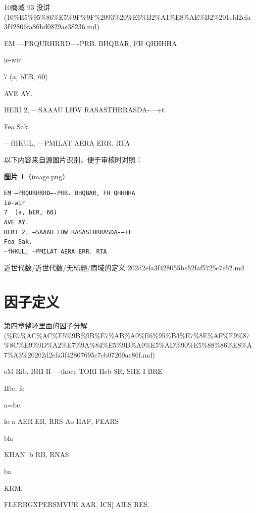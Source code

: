 \begin{note}[来源上级主题]

10商域 93 没讲 (10\%E5\%95\%86\%E5\%9F\%9F\%2093\%20\%E6\%B2\%A1\%E8\%AE\%B2\%201efd2efa3f42806fa86bd0829ae38236.md)

\end{note}

\begin{definition}[商域的定义]

EM —PRQURHRRD—-PRB. BHQBAR, FH QHHHHA

ie-wir

7  (a, bER, 60)

AVE AY.

HERI 2, —SAAAU LHW RASASTHRRASDA-—+t

Fea Sak.

—fHKUL, —PMILAT AERA ERR. RTA

\end{definition}

\begin{note}
以下内容来自源图片识别，便于审核时对照：

\textbf{图片 1}（image.png）
\begin{Verbatim}[fontsize=\small]
EM —PRQURHRRD—-PRB. BHQBAR, FH QHHHHA
ie-wir
7  (a, bER, 60)
AVE AY.
HERI 2, —SAAAU LHW RASASTHRRASDA-—+t
Fea Sak.
—fHKUL, —PMILAT AERA ERR. RTA
\end{Verbatim}

\end{note}

\begin{note}[来源路径]

近世代数/近世代数/无标题/商域的定义 202d2efa3f428055be52faf5725c7e52.md

\end{note}

\section*{因子定义}

\begin{note}[来源上级主题]

第四章整环里面的因子分解 (\%E7\%AC\%AC\%E5\%9B\%9B\%E7\%AB\%A0\%E6\%95\%B4\%E7\%8E\%AF\%E9\%87\%8C\%E9\%9D\%A2\%E7\%9A\%84\%E5\%9B\%A0\%E5\%AD\%90\%E5\%88\%86\%E8\%A7\%A3\%20202d2efa3f42807695c7cb07209ac86f.md)

\end{note}

\begin{definition}[因子定义]

eM Rib. BHI H—-thoce TORI Heb SR, SHE I BRE

Htc, fe

a=be.

fo a AER ER, RRS Ao HAF, FEARS

bla

KHAN. b RB, RNAS

ba

KRM.

FLERBGXPERSMVUE AAR, ICS] AILS RES.

\end{definition}

